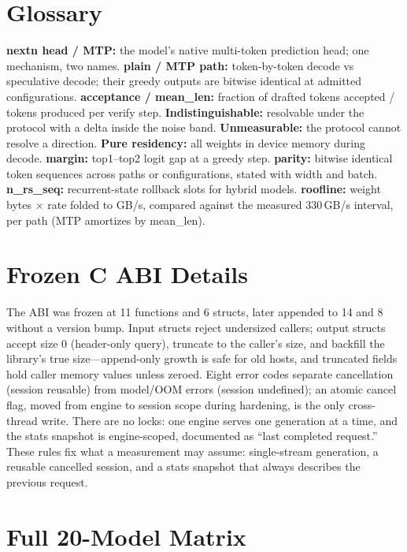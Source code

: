 \documentclass[letterpaper,twocolumn,10pt]{article}
\begin{document}
\appendix

\section{Glossary}
\label{app:glossary}

\textbf{nextn head / MTP:} the model's native multi-token prediction head; one
mechanism, two names. \textbf{plain / MTP path:} token-by-token decode vs
speculative decode; their greedy outputs are bitwise identical at admitted
configurations. \textbf{acceptance / mean\_len:} fraction of drafted tokens
accepted / tokens produced per verify step. \textbf{Indistinguishable:}
resolvable under the protocol with a delta inside the noise band.
\textbf{Unmeasurable:} the protocol cannot resolve a direction.
\textbf{Pure residency:} all weights in device memory during decode.
\textbf{margin:} top1--top2 logit gap at a greedy step. \textbf{parity:}
bitwise identical token sequences across paths or configurations, stated with
width and batch. \textbf{n\_rs\_seq:} recurrent-state rollback slots for
hybrid models. \textbf{roofline:} weight bytes $\times$ rate folded to GB/s,
compared against the measured 330\,GB/s interval, per path (MTP amortizes by
mean\_len).

\section{Frozen C ABI Details}
\label{app:abi}

The ABI was frozen at 11 functions and 6 structs, later appended to 14 and 8
without a version bump. Input structs reject undersized callers; output structs
accept size 0 (header-only query), truncate to the caller's size, and backfill
the library's true size---append-only growth is safe for old hosts, and
truncated fields hold caller memory values unless zeroed. Eight error codes
separate cancellation (session reusable) from model/OOM errors (session
undefined); an atomic cancel flag, moved from engine to session scope during
hardening, is the only cross-thread write. There are no locks: one engine serves
one generation at a time, and the stats snapshot is engine-scoped, documented as
``last completed request.'' These rules fix what a measurement may assume:
single-stream generation, a reusable cancelled session, and a stats snapshot
that always describes the previous request.

\section{Full 20-Model Matrix}
\label{app:matrix}
\end{document}
